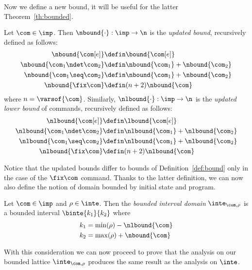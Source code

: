Now we define a new bound, it will be useful for the latter
Theorem~\ref{th:bounded}.

\begin{definition}\label{def:newbound}
  Let \(\com\in\imp\). Then \(\nbound{\cdot} : \imp \to \n\) is the
  \emph{updated bound}, recursively defined as follows:
  \begin{align*}
    \nbound{\com[e]} & \defin \bound{\com[e]} \\
    \nbound{\com_1 \ndet \com_2} & \defin \nbound{\com_1} + \nbound{\com_2} \\
    \nbound{\com_1 \seq \com_2} & \defin \nbound{\com_1} + \nbound{\com_2} \\
    \nbound{\fix\com} & \defin (n+2)\nbound{\com} \\
  \end{align*}
  where \(n = \varsof{\com}\). Similarly,
  \(\nlbound{\cdot} : \imp \to \n\) is the \emph{updated lower bound}
  of commands, recursively defined as follows:
  \begin{align*}
    \nlbound{\com[e]} & \defin \lbound{\com[e]} \\
    \nlbound{\com_1 \ndet \com_2} & \defin \nlbound{\com_1} + \nlbound{\com_2} \\
    \nlbound{\com_1 \seq \com_2} & \defin \nlbound{\com_1} + \nlbound{\com_2} \\
    \nlbound{\fix\com} & \defin (n+2)\nlbound{\com} \\
  \end{align*}
\end{definition}

Notice that the updated bounds differ to bounds of
Definition~\ref{def:bound} only in the case of the \(\fix\com\)
command.  Thanks to the latter definition, we can now also define the
notion of domain bounded by initial state and program.

\begin{definition}\label{def:boundedbycom}
  Let \(\com\in\imp\) and \(\rho \in \inte\). Then the \emph{bounded
    interval domain} \(\inte_{\com,\rho}\) is a bounded interval
  \(\binte{k_1}{k_2}\) where
  \begin{align*}
    k_1 & = \min(\rho) - \nlbound{\com} \\
    k_2 & = \max(\rho) + \nbound{\com}
  \end{align*}
\end{definition}

With this consideration we can now proceed to prove that the analysis
on our bounded lattice \(\inte_{\com,\rho}\) produces the same result
as the analysis on \(\inte\).

